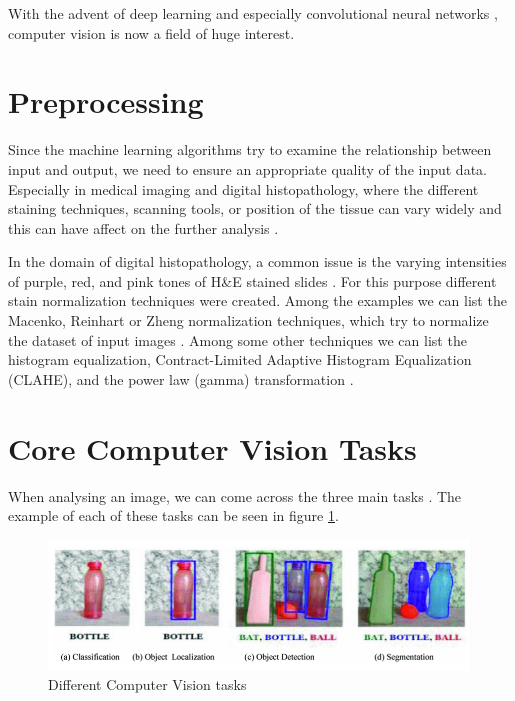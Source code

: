 With the advent of deep learning \cite{LeCun2015} and especially convolutional neural networks \cite{Ronneberger2015}, computer vision is now a field of huge interest.

\section{Preprocessing}
Since the machine learning algorithms try to examine the relationship between input and output, we need to ensure an appropriate quality of the input data. Especially in medical imaging and digital histopathology, where the different staining techniques, scanning tools, or position of the tissue can vary widely and this can have affect on the further analysis \cite{Hoque2024}.

In the domain of digital histopathology, a common issue is the varying intensities of purple, red, and pink tones of H\&E stained slides \cite{Hoque2024}. For this purpose different stain normalization techniques were created. Among the examples we can list the Macenko, Reinhart or Zheng normalization techniques, which try to normalize the dataset of input images \cite{Hoque2024}. Among some other techniques we can list the histogram equalization, Contract-Limited Adaptive Histogram Equalization (CLAHE), and the power law (gamma) transformation \cite{Dabass2020}.

\section{Core Computer Vision Tasks}
When analysing an image, we can come across the three main tasks \cite{Alam2021}. The example of each of these tasks can be seen in figure \ref{fig:aiml-tasks}.

\begin{figure}[H]
\begin{centering}
\includegraphics[width=12cm]{assets/images/aiml-tasks.png}
\par\end{centering}
\caption{Different Computer Vision tasks \cite{Alam2021}}
\label{fig:aiml-tasks}
\end{figure}

